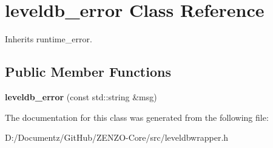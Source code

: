 \hypertarget{classleveldb__error}{}\section{leveldb\+\_\+error Class Reference}
\label{classleveldb__error}


Inherits runtime\+\_\+error.

\subsection*{Public Member Functions}
\begin{DoxyCompactItemize}
\item 
\mbox{\label{classleveldb__error_a20e012c5a8f796abd5c5af3f7829ee07}} 
{\bfseries leveldb\+\_\+error} (const std\+::string \&msg)
\end{DoxyCompactItemize}


The documentation for this class was generated from the following file\+:\begin{DoxyCompactItemize}
\item 
D\+:/\+Documentz/\+Git\+Hub/\+Z\+E\+N\+Z\+O-\/\+Core/src/leveldbwrapper.\+h\end{DoxyCompactItemize}
